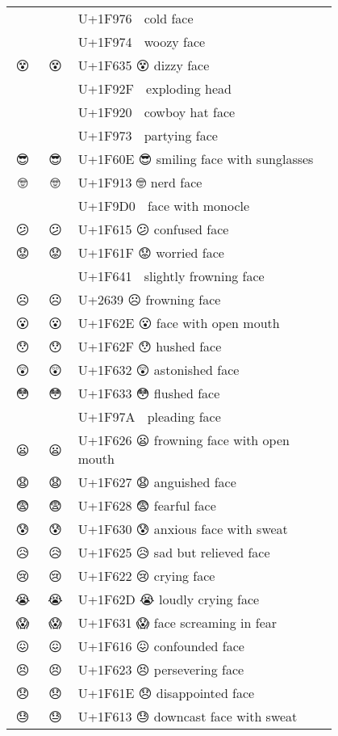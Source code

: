 \documentclass[a4paper,12pt]{article}
\newcommand{\fontA}[1]{{\fontspec[RawFeature={dist,ccmp}]{Segoe UI Emoji} #1}}
\newcommand{\fontB}[1]{{\fontspec[Ligatures=Common,RawFeature={+ccmp}]{Symbola_Hinted.ttf} #1}}
\begin{document}
\begin{longtable}[c]{ccp{0.8\linewidth}}
\fontA{🥶}&\fontB{🥶}&U+1F976 🥶 cold face\\
\fontA{🥴}&\fontB{🥴}&U+1F974 🥴 woozy face\\
\fontA{😵}&\fontB{😵}&U+1F635 😵 dizzy face\\
\fontA{🤯}&\fontB{🤯}&U+1F92F 🤯 exploding head\\
\fontA{🤠}&\fontB{🤠}&U+1F920 🤠 cowboy hat face\\
\fontA{🥳}&\fontB{🥳}&U+1F973 🥳 partying face\\
\fontA{😎}&\fontB{😎}&U+1F60E 😎 smiling face with sunglasses\\
\fontA{🤓}&\fontB{🤓}&U+1F913 🤓 nerd face\\
\fontA{🧐}&\fontB{🧐}&U+1F9D0 🧐 face with monocle\\
\fontA{😕}&\fontB{😕}&U+1F615 😕 confused face\\
\fontA{😟}&\fontB{😟}&U+1F61F 😟 worried face\\
\fontA{🙁}&\fontB{🙁}&U+1F641 🙁 slightly frowning face\\
\fontA{☹}&\fontB{☹}&U+2639 ☹ frowning face\\
\fontA{😮}&\fontB{😮}&U+1F62E 😮 face with open mouth\\
\fontA{😯}&\fontB{😯}&U+1F62F 😯 hushed face\\
\fontA{😲}&\fontB{😲}&U+1F632 😲 astonished face\\
\fontA{😳}&\fontB{😳}&U+1F633 😳 flushed face\\
\fontA{🥺}&\fontB{🥺}&U+1F97A 🥺 pleading face\\
\fontA{😦}&\fontB{😦}&U+1F626 😦 frowning face with open mouth\\
\fontA{😧}&\fontB{😧}&U+1F627 😧 anguished face\\
\fontA{😨}&\fontB{😨}&U+1F628 😨 fearful face\\
\fontA{😰}&\fontB{😰}&U+1F630 😰 anxious face with sweat\\
\fontA{😥}&\fontB{😥}&U+1F625 😥 sad but relieved face\\
\fontA{😢}&\fontB{😢}&U+1F622 😢 crying face\\
\fontA{😭}&\fontB{😭}&U+1F62D 😭 loudly crying face\\
\fontA{😱}&\fontB{😱}&U+1F631 😱 face screaming in fear\\
\fontA{😖}&\fontB{😖}&U+1F616 😖 confounded face\\
\fontA{😣}&\fontB{😣}&U+1F623 😣 persevering face\\
\fontA{😞}&\fontB{😞}&U+1F61E 😞 disappointed face\\
\fontA{😓}&\fontB{😓}&U+1F613 😓 downcast face with sweat\\

\end{longtable}
\end{document}
